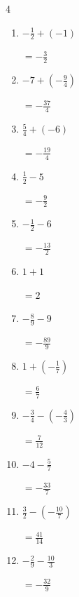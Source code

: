 \begin{multicols}{4}
\begin{enumerate}
        $\displaystyle =-\frac{43}{21}$

  \item $\displaystyle -\frac{1}{2} + \left(-1\right)$

        $\displaystyle =-\frac{3}{2}$

  \item $\displaystyle -7 + \left(-\frac{9}{4}\right)$

        $\displaystyle =-\frac{37}{4}$

  \item $\displaystyle \frac{5}{4} + \left(-6\right)$

        $\displaystyle =-\frac{19}{4}$

  \item $\displaystyle \frac{1}{2} - 5$

        $\displaystyle =-\frac{9}{2}$

\columnbreak %

  \item $\displaystyle -\frac{1}{2} - 6$

        $\displaystyle =-\frac{13}{2}$

  \item $\displaystyle 1 + 1$

        $\displaystyle =2$

  \item $\displaystyle -\frac{8}{9} - 9$

        $\displaystyle =-\frac{89}{9}$

  \item $\displaystyle 1 + \left(-\frac{1}{7}\right)$

        $\displaystyle =\frac{6}{7}$

  \item $\displaystyle -\frac{3}{4} - \left(-\frac{4}{3}\right)$

        $\displaystyle =\frac{7}{12}$

  \item $\displaystyle -4 - \frac{5}{7}$

        $\displaystyle =-\frac{33}{7}$

  \item $\displaystyle \frac{3}{2} - \left(-\frac{10}{7}\right)$

        $\displaystyle =\frac{41}{14}$

  \item $\displaystyle -\frac{2}{9} - \frac{10}{3}$

        $\displaystyle =-\frac{32}{9}$


\end{enumerate}
\end{multicols}
